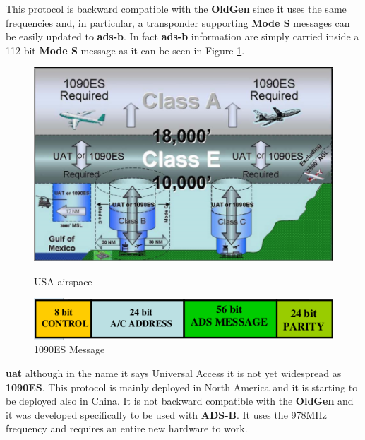 \documentclass[../main.tex]{subfiles}
\begin{document}
This protocol is backward compatible with the \textbf{OldGen} since it uses the same frequencies and, in particular, a transponder supporting \textbf{Mode S} messages can be easily updated to \textbf{\acrshort{ads-b}}. In fact \textbf{\acrshort{ads-b}} information are simply carried inside a 112 bit \textbf{Mode S} message as it can be seen in Figure \ref{fig:1090es}.


\begin{figure}[htp]
\centering
\begin{minipage}{.5\textwidth}
  \centering
  \includegraphics[scale=0.35]{images/uatvs1090.png}
  \caption{USA airspace}
  \label{fig:uatvs1090}
\end{minipage}%
\begin{minipage}{.5\textwidth}
  \centering
  \includegraphics[scale=0.45]{images/1090es.png}
  \caption{1090ES Message}
  \label{fig:1090es}
\end{minipage}
\end{figure}

\textbf{\acrshort{uat}} although in the name it says Universal Access it is not yet widespread as \textbf{1090ES}. This protocol is mainly deployed in North America and it is starting to be deployed also in China. It is not backward compatible with the \textbf{OldGen} and it was developed specifically to be used with \textbf{ADS-B}. It uses the 978MHz frequency and requires an entire new hardware to work.
\end{document}
